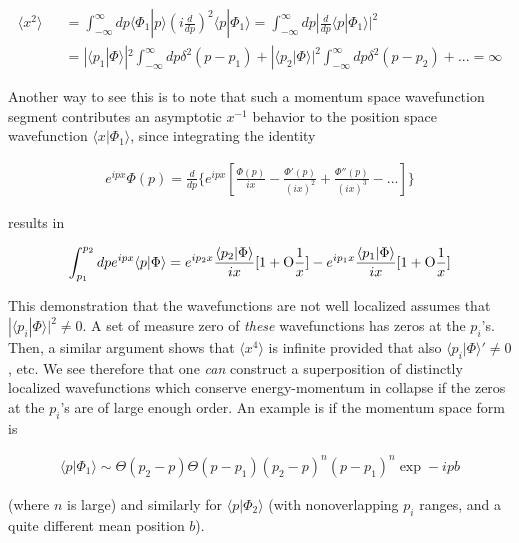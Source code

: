 \documentclass{article}
\begin{document}
\begin{eqnarray*}
\langle x^{2}\rangle \!\!\!\!\!\!\!\!\!\!&&=\int_{-\infty}^ {\infty}dp\langle\Phi_{1}|p\rangle 
(i\frac{d}{dp})^{2}\langle p|\Phi_{1}\rangle =
\int_{-\infty}^ {\infty}dp|\frac {d}{dp}\langle p|\Phi_{1}\rangle|^{2}\\
&&=|\langle p_{1}|\Phi\rangle|^{2}\int_{-\infty}^ {\infty}dp\delta^{2}(p-p_{1})+
|\langle p_{2}|\Phi\rangle|^{2}\int_{-\infty}^ {\infty}dp\delta^{2}(p-p_{2})+...=\infty
\end{eqnarray*}
  
	Another way to see this is to note that such a momentum space wavefunction segment 
contributes an asymptotic $x^{-1}$ behavior to the position space wavefunction $\langle x|\Phi_{1}\rangle$,  
since integrating the identity

\begin{eqnarray*}
e^{ipx}\Phi (p)=\frac{d}{dp}\{e^{ipx}[\frac{\Phi (p)}{ix}-\frac{\Phi '(p)}{(ix)^{2}}+
\frac{\Phi ''(p)}{(ix)^{3}}-...]\}
\end{eqnarray*} 

\noindent results in 

\begin{eqnarray}\label{2}
\int_{p_{1}}^{p_{2}}dpe^{ipx}\langle p|\Phi\rangle=
e^{ip_{2}x}\frac{\langle p_{2}|\Phi\rangle}{ix}[1+\hbox{O}\frac{1}{x}]-
e^{ip_{1}x}\frac{\langle p_{1}|\Phi\rangle}{ix}[1+\hbox{O}\frac{1}{x}]
\end{eqnarray}

	 This demonstration that the wavefunctions are not well localized 
assumes that $|\langle p_{i}|\Phi\rangle|^{2}\neq 0$. A set of measure zero 
of {\it these} wavefunctions 
has zeros at the $p_{i}$'s.  Then, a similar argument shows that $\langle x^{4}\rangle$ 
is infinite provided that also $\langle p_{i}|\Phi\rangle '\neq 0$, etc. We see 
therefore that one {\it can} construct 
a superposition of distinctly localized wavefunctions which conserve energy-momentum 
in collapse if the zeros at the $p_{i}$'s are of large enough order. An example is if the momentum space form is 

\begin{eqnarray*}
\langle p|\Phi_{1}\rangle\sim\Theta (p_{2}-p)\Theta (p-p_{1})(p_{2}-p)^{n}(p-p_{1})^{n}\exp -ipb 
\end{eqnarray*}

\noindent (where $n$ is large) and similarly for $\langle p|\Phi_{2}\rangle$ (with nonoverlapping $p_{i}$ 
ranges, and a quite different mean position $b$).
\end{document}
